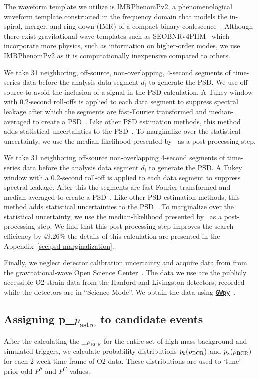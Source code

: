 \documentclass[%
 nofootinbib,
 amsmath,amssymb,
 aps,
 twocolumn,
 superscriptaddress
]{revtex4-2}
\newcommand{\gwpy}{{\sc \href{https://gwpy.github.io/}{\texttt{GWpy}}}\xspace}
\newcommand{\imrphenomp}{{\sc IMRPhenomPv2}\xspace}
\newcommand{\seob}{{\sc SEOBNRv4PHM}\xspace}
\newcommand{\fancytext}[1]{{\relax\ifmmode#1\else $#1$\fi}\xspace}
\newcommand{\mathcmd}[1]{{\sc \relax\ifmmode#1\else $#1$\fi}\xspace}
\newcommand{\bcr}{\mathcmd{\rho_\text{BCR}}}
\newcommand{\pastro}{\fancytext{p_\text{astro}}}
\begin{document}
The waveform template we utilize is \imrphenomp, a phenomenological waveform template constructed in the frequency domain that models the in-spiral, merger, and ring-down (IMR) of a compact binary coalescence~\citep{khan2016frequency}. Although there exist gravitational-wave templates such as \seob~\cite{seobnrv4phm} which incorporate more physics, such as information on higher-order modes, we use \imrphenomp as it is computationally inexpensive compared to others.

We take 31 neighboring, off-source, non-overlapping, 4-second segments of time-series data before the analysis data segment $d_i$ to generate the PSD. We use off-source to avoid the inclusion of a signal in the PSD calculation. A Tukey window with 0.2-second roll-offs is applied to each data segment to suppress spectral leakage after which the segments are fast-Fourier transformed and median-averaged to create a PSD~\cite{ligo_psd}. Like other PSD estimation methods, this method adds statistical uncertainties to the PSD~\cite{psd_student_t, chatziioannou2019noise}. To marginalize over the statistical uncertainty, we use the median-likelihood presented by~\citet{psd_student_t} as a post-processing step. 

We take 31 neighboring off-source non-overlapping  4-second  segments of time-series data before the analysis data segment $d_i$ to generate the PSD.  A Tukey window with a 0.2-second roll-off is applied to each data segment to suppress spectral leakage. After this  the segments are fast-Fourier transformed and median-averaged to create a PSD~\cite{ligo_psd}. Like other PSD estimation methods, this method adds statistical uncertainties to the PSD~\cite{psd_student_t, chatziioannou2019noise, Biscoveanu:2020:PhRvD}. To marginalize over the statistical uncertainty, we use the median-likelihood presented by~\citet{psd_student_t} as a post-processing step. We find that this post-processing step improves the search efficiency by $49.26\%$ the details of this calculation are presented in the Appendix~\ref{sec:psd-marginalization}.

Finally, we neglect detector calibration uncertainty and acquire data from from the gravitational-wave Open Science Center~\cite{GWOSC}. The data we use are the publicly accessible O2 strain data from the Hanford and Livingston detectors, recorded while the detectors are in ``Science Mode''. We obtain the data using \gwpy~\cite{gwpy}. 

\subsection{Assigning \pastro to candidate events}
After the calculating the \bcr for the entire set of high-mass background and simulated triggers, we calculate probability distributions $p_b(\bcr)$ and $p_s(\bcr)$ for each 2-week time-frame of O2 data. These distributions are used to `tune' prior-odd $P^S$ and $P^G$ values.
\end{document}
